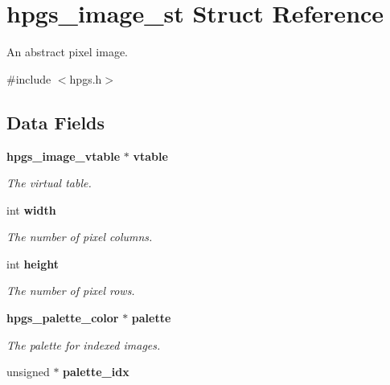 \section{hpgs\_\-image\_\-st Struct Reference}
\label{structhpgs__image__st}


An abstract pixel image.  




{\ttfamily \#include $<$hpgs.h$>$}

\subsection*{Data Fields}
\begin{DoxyCompactItemize}
\item 
{\bf hpgs\_\-image\_\-vtable} $\ast$ {\bf vtable}\label{structhpgs__image__st_a0de6389c8fc6ca75b717ec62e78d5d73}

\begin{DoxyCompactList}\small\item\em The virtual table. \item\end{DoxyCompactList}\item 
int {\bf width}\label{structhpgs__image__st_add77f1803c6ea3b4e342335d89a45ea0}

\begin{DoxyCompactList}\small\item\em The number of pixel columns. \item\end{DoxyCompactList}\item 
int {\bf height}\label{structhpgs__image__st_a5f901ebe47134399a6a3790cf77a530c}

\begin{DoxyCompactList}\small\item\em The number of pixel rows. \item\end{DoxyCompactList}\item 
{\bf hpgs\_\-palette\_\-color} $\ast$ {\bf palette}\label{structhpgs__image__st_a150ba16c6c1849a7d2d8e9d11bead1e2}

\begin{DoxyCompactList}\small\item\em The palette for indexed images. \item\end{DoxyCompactList}\item 
unsigned $\ast$ {\bf palette\_\-idx}\label{structhpgs__image__st_ae4f27994d2e61465876786b37142353d}


\end{DoxyCompactItemize}
